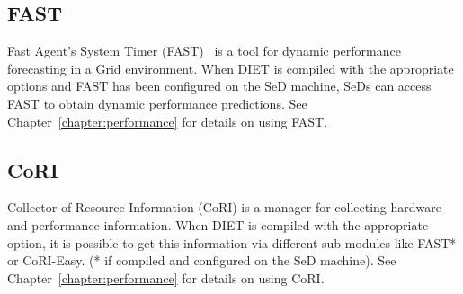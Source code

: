 \subsection{FAST}
\label{sub:fast}

Fast Agent's System Timer (FAST)~\cite{Qui02} is a tool for dynamic
performance forecasting in a Grid environment.  When DIET is
compiled with the appropriate options and FAST has been configured
on the SeD machine, SeDs can access FAST to obtain dynamic
performance predictions.  See Chapter~\ref{chapter:performance} for details
on using FAST.

\subsection{CoRI}
\label{sub:cori}

Collector of Resource Information (CoRI) is a manager for collecting
hardware and performance information.  When DIET is compiled with
the appropriate option, it is possible to get this information via
different sub-modules like FAST* or CoRI-Easy. (* if compiled and
configured on the SeD machine). See Chapter~\ref{chapter:performance}
for details on using CoRI.



